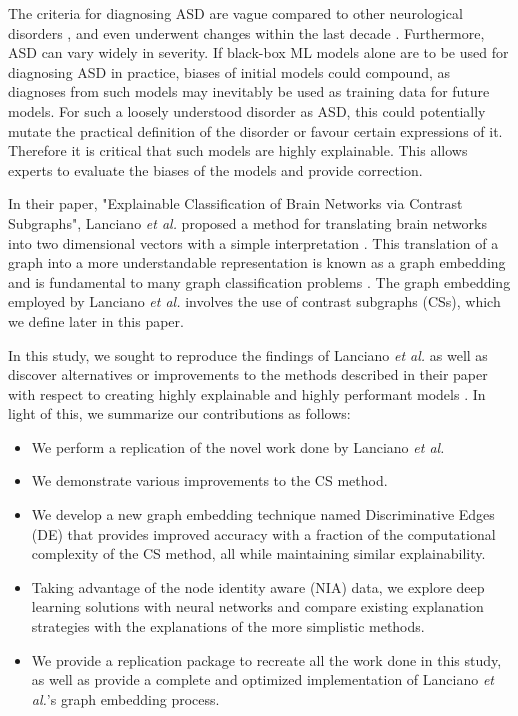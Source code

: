 \documentclass[letterpaper]{article}
\begin{document}
The criteria for diagnosing ASD are vague compared to other neurological disorders \cite{dsm52013}, and even underwent changes within the last decade \cite{grant2013}.
Furthermore, ASD can vary widely in severity.
If black-box ML models alone are to be used for diagnosing ASD in practice, biases of initial models could compound, as diagnoses from such models may inevitably be used as training data for future models.
For such a loosely understood disorder as ASD, this could potentially mutate the practical definition of the disorder or favour certain expressions of it.
Therefore it is critical that such models are highly explainable.
This allows experts to evaluate the biases of the models and provide correction.

In their paper, "Explainable Classification of Brain Networks via Contrast Subgraphs", Lanciano \emph{et al.} proposed a method for translating brain networks into two dimensional vectors with a simple interpretation \cite{lanciano2020}.
This translation of a graph into a more understandable representation is known as a graph embedding and is fundamental to many graph classification problems \cite{goyal2018}.
The graph embedding employed by Lanciano \emph{et al.} involves the use of contrast subgraphs (CSs), which we define later in this paper.

In this study, we sought to reproduce the findings of Lanciano \emph{et al.} as well as discover alternatives or improvements to the methods described in their paper with respect to creating highly explainable and highly performant models \cite{lanciano2020}.
In light of this, we summarize our contributions as follows:

\begin{itemize}
    \item We perform a replication of the novel work done by Lanciano \emph{et al.}
    \item We demonstrate various improvements to the CS method.
    \item We develop a new graph embedding technique named Discriminative Edges (DE) that provides improved accuracy with a fraction of the computational complexity of the CS method, all while maintaining similar explainability.
    \item Taking advantage of the node identity aware (NIA) data, we explore deep learning solutions with neural networks and compare existing explanation strategies with the explanations of the more simplistic methods.
    \item We provide a replication package to recreate all the work done in this study, as well as provide a complete and optimized implementation of Lanciano \emph{et al.}'s graph embedding process.
\end{itemize}
\end{document}
